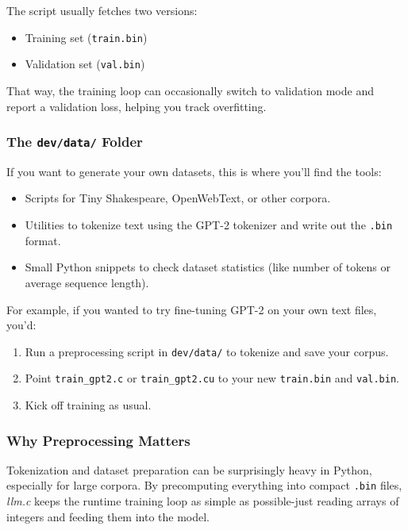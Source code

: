 \documentclass[
  letterpaper,
  DIV=11,
  numbers=noendperiod]{scrreprt}
\providecommand{\tightlist}{%
  \setlength{\itemsep}{0pt}\setlength{\parskip}{0pt}}
\begin{document}
The script usually fetches two versions:

\begin{itemize}
\tightlist
\item
  Training set (\texttt{train.bin})
\item
  Validation set (\texttt{val.bin})
\end{itemize}

That way, the training loop can occasionally switch to validation mode
and report a validation loss, helping you track overfitting.

\subsubsection{\texorpdfstring{The \texttt{dev/data/}
Folder}{The dev/data/ Folder}}\label{the-devdata-folder}

If you want to generate your own datasets, this is where you'll find the
tools:

\begin{itemize}
\tightlist
\item
  Scripts for Tiny Shakespeare, OpenWebText, or other corpora.
\item
  Utilities to tokenize text using the GPT-2 tokenizer and write out the
  \texttt{.bin} format.
\item
  Small Python snippets to check dataset statistics (like number of
  tokens or average sequence length).
\end{itemize}

For example, if you wanted to try fine-tuning GPT-2 on your own text
files, you'd:

\begin{enumerate}
\def\labelenumi{\arabic{enumi}.}
\tightlist
\item
  Run a preprocessing script in \texttt{dev/data/} to tokenize and save
  your corpus.
\item
  Point \texttt{train\_gpt2.c} or \texttt{train\_gpt2.cu} to your new
  \texttt{train.bin} and \texttt{val.bin}.
\item
  Kick off training as usual.
\end{enumerate}

\subsubsection{Why Preprocessing
Matters}\label{why-preprocessing-matters}

Tokenization and dataset preparation can be surprisingly heavy in
Python, especially for large corpora. By precomputing everything into
compact \texttt{.bin} files, \emph{llm.c} keeps the runtime training
loop as simple as possible-just reading arrays of integers and feeding
them into the model.
\end{document}
